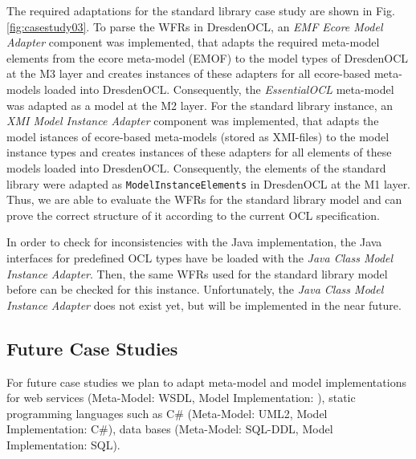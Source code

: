 The required adaptations for the standard library case study are shown in Fig. \ref{fig:casestudy03}.
To parse the WFRs in DresdenOCL, an \textit{EMF Ecore Model Adapter} component was implemented, that 
adapts the required meta-model elements from the ecore meta-model (EMOF) to the model 
types of DresdenOCL at the M3 layer and creates instances of these adapters for all ecore-based
meta-models loaded into DresdenOCL. 
Consequently, the  \textit{EssentialOCL} meta-model was adapted as a model at the M2 layer.
For the standard library instance, an \textit{XMI Model Instance Adapter} component was implemented,
that adapts the model istances of ecore-based meta-models (stored as XMI-files)
to the model instance types and creates instances of these adapters for all elements of these models
loaded into DresdenOCL. Consequently, the elements of the standard library
were adapted as \texttt{ModelInstanceElements} in DresdenOCL at the M1 layer.
Thus, we are able to evaluate the WFRs for the standard library model and can prove the correct 
structure of it according to the current OCL specification. 

In order to check for inconsistencies with the Java implementation, the Java interfaces 
for predefined OCL types have  be loaded with the \textit{Java Class Model Instance Adapter}. Then, the same WFRs 
used for the standard library model before can be checked for this instance. 
Unfortunately, the \textit{Java Class Model Instance Adapter} does not exist yet, but will be 
implemented in the near future.


\subsection{Future Case Studies}

For future case studies we plan to adapt meta-model and model implementations for web services (Meta-Model: WSDL, Model Implementation: ), static programming languages such as C\# (Meta-Model: UML2, Model Implementation: C\#), data bases (Meta-Model: SQL-DDL, Model Implementation: SQL). 

